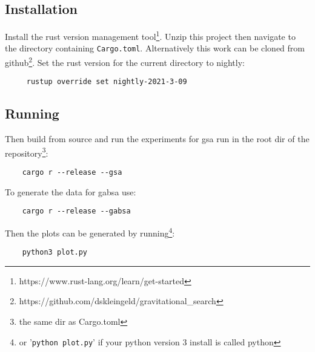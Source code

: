 \lstset{
  language=bash,
  basicstyle=\ttfamily
}
%
\subsection{Installation}
Install the rust version management tool\footnote{https://www.rust-lang.org/learn/get-started}. Unzip this project then navigate to the directory containing \texttt{Cargo.toml}. Alternatively this work can be cloned from github\footnote{https://github.com/dskleingeld/gravitational\_search}. Set the rust version for the current directory to nightly:
%
\begin{lstlisting}
	 rustup override set nightly-2021-3-09
\end{lstlisting}
%
\subsection{Running}
Then build from source and run the experiments for \ac{gsa} run in the root dir of the repository\footnote{the same dir as Cargo.toml}:
\begin{lstlisting}
	cargo r --release --gsa
\end{lstlisting}
%
To generate the data for \ac{gabsa} use:
\begin{lstlisting}
	cargo r --release --gabsa
\end{lstlisting}
%
Then the plots can be generated by running\footnote{or '\lstinline{python plot.py}' if your python version 3 install is called python}:
%
\begin{lstlisting}
	python3 plot.py
\end{lstlisting}
